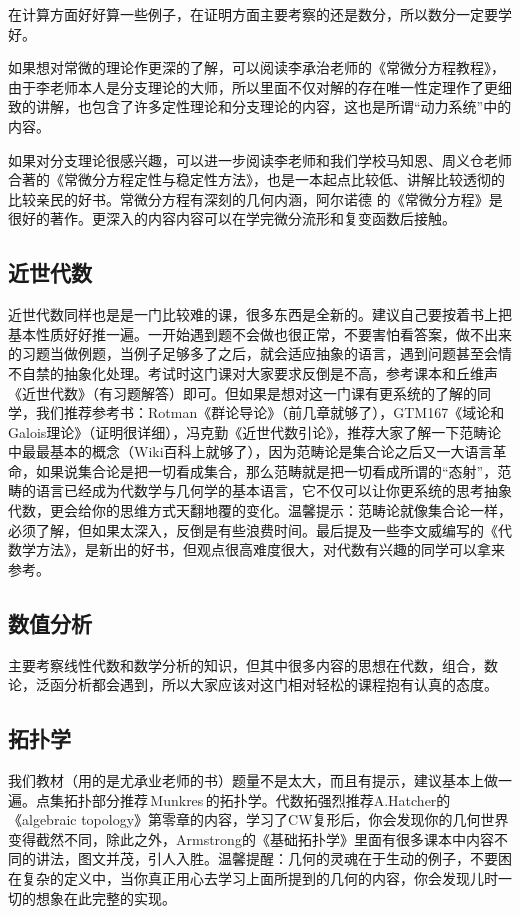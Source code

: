 在计算方面好好算一些例子，在证明方面主要考察的还是数分，所以数分一定要学好。\par
如果想对常微的理论作更深的了解，可以阅读李承治老师的《常微分方程教程》，由于李老师本人是分支理论的大师，所以里面不仅对解的存在唯一性定理作了更细致的讲解，也包含了许多定性理论和分支理论的内容，这也是所谓“动力系统”中的内容。\par
如果对分支理论很感兴趣，可以进一步阅读李老师和我们学校马知恩、周义仓老师合著的《常微分方程定性与稳定性方法》，也是一本起点比较低、讲解比较透彻的比较亲民的好书。常微分方程有深刻的几何内涵，阿尔诺德 的《常微分方程》是很好的著作。更深入的内容内容可以在学完微分流形和复变函数后接触。

\subsection{近世代数}

近世代数同样也是是一门比较难的课，很多东西是全新的。建议自己要按着书上把基本性质好好推一遍。一开始遇到题不会做也很正常，不要害怕看答案，做不出来的习题当做例题，当例子足够多了之后，就会适应抽象的语言，遇到问题甚至会情不自禁的抽象化处理。考试时这门课对大家要求反倒是不高，参考课本和丘维声《近世代数》（有习题解答）即可。但如果是想对这一门课有更系统的了解的同学，我们推荐参考书：Rotman《群论导论》（前几章就够了），GTM167《域论和Galois理论》（证明很详细），冯克勤《近世代数引论》，推荐大家了解一下范畴论中最最基本的概念（Wiki百科上就够了），因为范畴论是集合论之后又一大语言革命，如果说集合论是把一切看成集合，那么范畴就是把一切看成所谓的“态射”，范畴的语言已经成为代数学与几何学的基本语言，它不仅可以让你更系统的思考抽象代数，更会给你的思维方式天翻地覆的变化。温馨提示：范畴论就像集合论一样，必须了解，但如果太深入，反倒是有些浪费时间。最后提及一些李文威编写的《代数学方法》，是新出的好书，但观点很高难度很大，对代数有兴趣的同学可以拿来参考。

\subsection{数值分析}
主要考察线性代数和数学分析的知识，但其中很多内容的思想在代数，组合，数论，泛函分析都会遇到，所以大家应该对这门相对轻松的课程抱有认真的态度。
\subsection{拓扑学}

我们教材（用的是尤承业老师的书）题量不是太大，而且有提示，建议基本上做一遍。点集拓扑部分推荐\,Munkres\,的拓扑学。代数拓强烈推荐A.Hatcher的《algebraic topology》第零章的内容，学习了CW复形后，你会发现你的几何世界变得截然不同，除此之外，Armstrong的《基础拓扑学》里面有很多课本中内容不同的讲法，图文并茂，引人入胜。温馨提醒：几何的灵魂在于生动的例子，不要困在复杂的定义中，当你真正用心去学习上面所提到的几何的内容，你会发现儿时一切的想象在此完整的实现。\par


